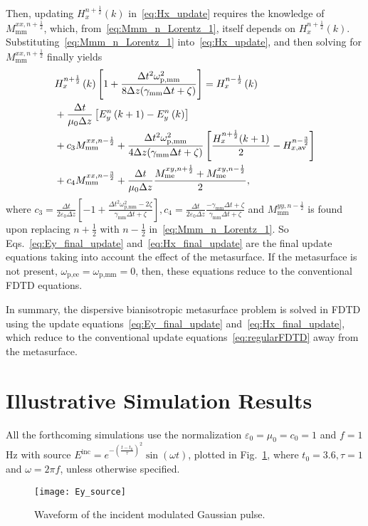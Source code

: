 \documentclass[journal]{IEEEtran}
\begin{document}
%
Then, updating $H_x^{n+\frac{1}{2}}\left(k\right)$ in~\eqref{eq:Hx_update} requires the knowledge of $M_\textrm{mm}^{xx,n+\frac{1}{2}}$, which, from~\eqref{eq:Mmm_n_Lorentz_1}, itself depends on $H_x^{n+\frac{1}{2}}\left(k\right)$. Substituting~\eqref{eq:Mmm_n_Lorentz_1} into~\eqref{eq:Hx_update}, and then solving for $M_\textrm{mm}^{xx,n+\frac{1}{2}}$ finally yields
\begin{align}\label{eq:Hx_final_update}
  &H_x^{n+\frac{1}{2}}\left(k\right)\left[1+\frac{\Delta t^2\omega^2_\textrm{p,mm}}{8\Delta z(\gamma_\textrm{mm}\Delta t+\zeta)}\right]=H_x^{n-\frac{1}{2}}\left(k\right)\\\notag&+\frac{\Delta t}{\mu_0\Delta z}\left[E_y^n\left(k+1\right)-E_y^n\left(k\right)\right]\\\notag &+c_3M_\textrm{mm}^{xx,n-\frac{1}{2}}+\frac{\Delta t^2\omega^2_\textrm{p,mm}}{4\Delta z(\gamma_\textrm{mm}\Delta t+\zeta)}\left[ \frac{H_{x}^{n+\frac{1}{2}}(k+1)}{2}-H_{x,\textrm{av}}^{n-\frac{3}{2}}\right]\\\notag&+c_4M_\textrm{mm}^{xx,n-\frac{3}{2}}+\frac{\Delta t}{\mu_0 \Delta z}\frac{M_\textrm{me}^{xy,n+\frac{1}{2}}+M_\textrm{me}^{xy,n-\frac{1}{2}}}{2},
\end{align}
where $c_3=\frac{\Delta t}{2\varepsilon_0\Delta z}\left[-1+\frac{\Delta t^2\omega^2_\textrm{p,mm}-2\zeta}{\gamma_\textrm{mm}\Delta t+\zeta}\right], c_4=\frac{\Delta t}{2\varepsilon_0\Delta z}\frac{-\gamma_\textrm{mm}\Delta t+\zeta}{\gamma_\textrm{mm}\Delta t+\zeta}$ and $M_\textrm{mm}^{yy,n-\frac{1}{2}}$ is found upon replacing $n+\frac{1}{2}$ with $n-\frac{1}{2}$ in~\eqref{eq:Mmm_n_Lorentz_1}.
So Eqs.~\eqref{eq:Ey_final_update} and~\eqref{eq:Hx_final_update} are the final update equations taking into account the effect of the metasurface. If the metasurface is not present, $\omega_\textrm{p,ee}=\omega_\textrm{p,mm}=0$, then, these equations reduce to the conventional FDTD equations.

In summary, the dispersive bianisotropic metasurface problem is solved in FDTD using the update equations~\eqref{eq:Ey_final_update} and~\eqref{eq:Hx_final_update}, which reduce to the conventional update equations~\eqref{eq:regularFDTD} away from the metasurface.

\section{Illustrative Simulation Results}\label{sec:examples}
All the forthcoming simulations use the normalization $\varepsilon_0=\mu_0=c_0=1$ and $f=1$ Hz with source $E^\textrm{inc}=e^{-(\frac{t-t_0}{\tau})^2}\sin(\omega t)$, plotted in Fig.~\ref{fig:Ey_source}, where $t_0=3.6, \tau=1$ and $\omega=2\pi f$, unless otherwise specified.
%
\begin{figure}[!ht]
\centering
\texttt{[image: Ey\_source]}
\caption{Waveform of the incident modulated Gaussian pulse.}
\label{fig:Ey_source}
\end{figure}
\end{document}
